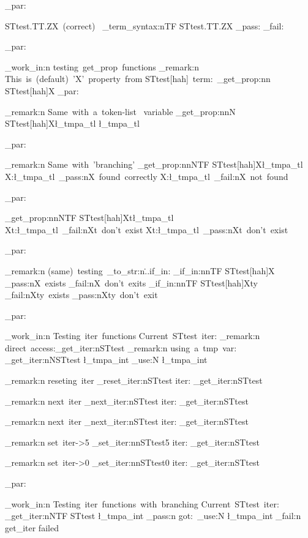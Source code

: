 \documentclass{article}
\begin{document}
\sttests_par:

STtest.TT.ZX~(correct)~
\starray_term_syntax:nTF {STtest.TT.ZX}
  {\sttests_pass:}
  {\sttests_fail:}

\sttests_par:

  
\sttests_work_in:n {testing~get_prop~functions}
\sttests_remark:n {This~is~(default)~'X'~property~from STtest[hah]~term:~}\starray_get_prop:nn {STtest[hah]}{X}
\sttests_par:


\sttests_remark:n {Same~with~a~token-list~ variable}
\starray_get_prop:nnN {STtest[hah]}{X}\l_tmpa_tl
\l_tmpa_tl

\sttests_par:

\sttests_remark:n {Same~with~'branching'}
\starray_get_prop:nnNTF {STtest[hah]}{X}\l_tmpa_tl
  {X:\l_tmpa_tl~\sttests_pass:n{X~found~correctly}}
  {X:\l_tmpa_tl~\sttests_fail:n{X~not~found}}

\sttests_par:

\starray_get_prop:nnNTF {STtest[hah]}{Xt}\l_tmpa_tl
  {Xt:\l_tmpa_tl~\sttests_fail:n{Xt~don't~exist}}
  {Xt:\l_tmpa_tl~\sttests_pass:n{Xt~don't~exist}}

\sttests_par:

\sttests_remark:n {(same)~testing~\tl_to_str:n{\...if_in:}}
\starray_if_in:nnTF {STtest[hah]}{X}
  {\sttests_pass:n{X~exists}}
  {\sttests_fail:n{X~don't~exits}}
\starray_if_in:nnTF {STtest[hah]}{Xty}
  {\sttests_fail:n{Xty~exists}}
  {\sttests_pass:n{Xty~don't~exit}}


\sttests_par:

\sttests_work_in:n {Testing~iter~functions}
Current~STtest~iter: 
\sttests_remark:n {direct~access:\starray_get_iter:n{STtest}}
\sttests_remark:n {using~a~tmp~var: \starray_get_iter:nN{STtest} \l_tmpa_int \int_use:N \l_tmpa_int}

\sttests_remark:n {reseting~iter} \starray_reset_iter:n{STtest}
iter: \starray_get_iter:n{STtest}

\sttests_remark:n {next~iter} \starray_next_iter:n{STtest}
iter: \starray_get_iter:n{STtest}

\sttests_remark:n {next~iter} \starray_next_iter:n{STtest}
iter: \starray_get_iter:n{STtest}

\sttests_remark:n {set~iter->5} \starray_set_iter:nn{STtest}{5}
iter: \starray_get_iter:n{STtest}

\sttests_remark:n {set~iter->0} \starray_set_iter:nn{STtest}{0}
iter: \starray_get_iter:n{STtest}

\sttests_par:

\sttests_work_in:n {Testing~iter~functions~with~branching}
Current~STtest~iter: 
\starray_get_iter:nNTF {STtest} \l_tmpa_int 
  {\sttests_pass:n {got:~\int_use:N \l_tmpa_int}}
  {\sttests_fail:n {get_iter failed}}
\end{document}
